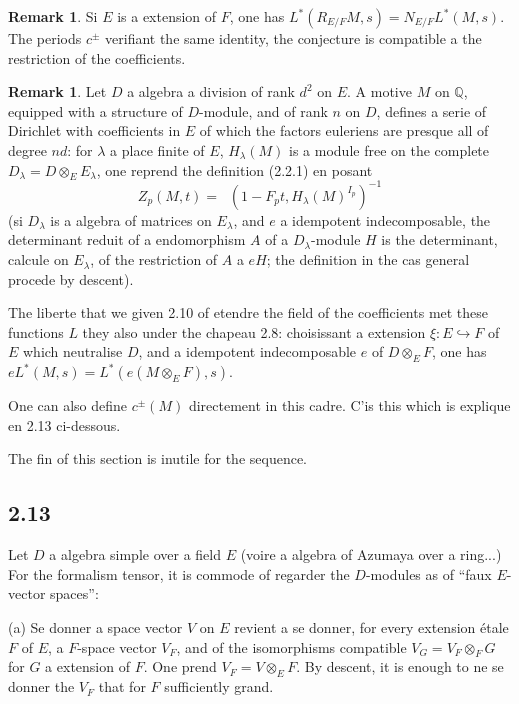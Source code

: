 \documentclass[12pt,a4paper]{article}
\theoremstyle{plain}
\theoremstyle{definition}
\newtheorem{remark}[definition]{Remark}
\theoremstyle{remark}
\DeclareMathOperator{\detred}{det^{red}}
\newcommand{\Q}{\mathbb{Q}}
\begin{document}
\begin{remark}
Si $E$ is a extension of $F$, one has $L^*(R_{E/F} M, s) = N_{E/F} L^*(M, s)$. The periods
$c^\pm$ verifiant the same identity, the conjecture is compatible a the restriction of the coefficients.
\end{remark}

\begin{remark}
Let $D$ a algebra a division of rank $d^2$ on $E$. A motive $M$ on $\Q$, equipped with a
structure of $D$-module, and of rank $n$ on $D$, defines a serie of Dirichlet with coefficients in $E$ of which the factors euleriens are presque all of degree $nd$: for $\lambda$ a place
finite of $E$, $H_\lambda(M)$ is a module free on the complete $D_\lambda = D \otimes_E E_\lambda$,
one reprend the definition (2.2.1) en posant
\[
Z_p(M, t) = \detred(1 - F_p t, H_\lambda(M)^{I_p})^{-1}
\]
(si $D_\lambda$ is a algebra of matrices on $E_\lambda$, and $e$ a idempotent indecomposable, the
determinant reduit of a endomorphism $A$ of a $D_\lambda$-module $H$ is the determinant,
calcule on $E_\lambda$, of the restriction of $A$ a $eH$; the definition in the cas general procede
by descent).

The liberte that we given 2.10 of etendre the field of the coefficients met these functions $L$
they also under the chapeau 2.8: choisissant a extension $\xi: E \hookrightarrow F$ of $E$
which neutralise $D$, and a idempotent indecomposable $e$ of $D \otimes_E F$, one has
$e L^*(M, s) = L^*(e(M \otimes_E F), s)$.

One can also define $c^\pm(M)$ directement in this cadre. C'is this which is explique
en 2.13 ci-dessous.
\end{remark}

The fin of this section is inutile for the sequence.

\subsection*{2.13}

Let $D$ a algebra simple over a field $E$ (voire a algebra of Azumaya over a ring...) For the formalism tensor, it is commode of regarder the $D$-modules
as of ``faux $E$-vector spaces'':

(a) Se donner a space vector $V$ on $E$ revient a se donner, for every extension
étale $F$ of $E$, a $F$-space vector $V_F$, and of the isomorphisms compatible
$V_G = V_F \otimes_F G$ for $G$ a extension of $F$. One prend $V_F = V \otimes_E F$. By descent,
it is enough to ne se donner the $V_F$ that for $F$ sufficiently grand.
\end{document}
